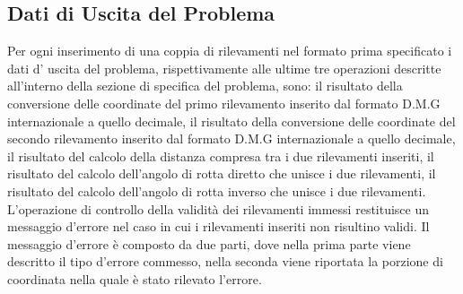 \documentclass{article}
\begin{document}
\subsection{Dati di Uscita del Problema}
Per ogni inserimento di una coppia di rilevamenti nel formato prima specificato i dati d' uscita del problema, rispettivamente alle ultime tre operazioni descritte all'interno della sezione di specifica del problema, sono: il risultato della conversione delle coordinate del primo rilevamento inserito dal formato D.M.G internazionale a quello decimale, il risultato della conversione delle coordinate del secondo rilevamento inserito dal formato D.M.G internazionale a quello decimale, il risultato del calcolo della distanza compresa tra i due rilevamenti inseriti, il risultato del calcolo dell'angolo di rotta diretto che unisce i due rilevamenti, il risultato del calcolo dell'angolo di rotta inverso che unisce i due rilevamenti. 
L'operazione di controllo della validità dei rilevamenti immessi restituisce un messaggio d'errore nel caso in cui i rilevamenti inseriti non risultino validi. Il messaggio d'errore è composto da due parti, dove nella prima parte viene descritto il tipo d'errore commesso, nella seconda viene riportata la porzione di coordinata nella quale è stato rilevato l'errore. 
\end{document}

